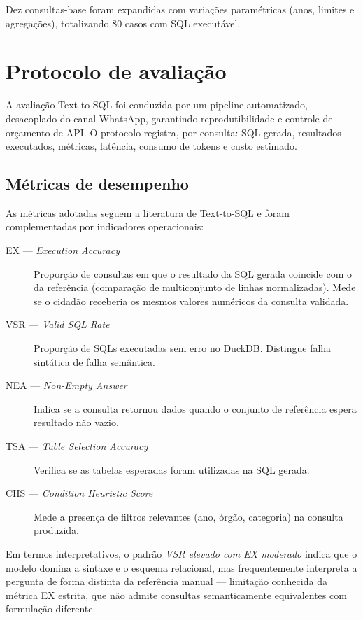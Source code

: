 Dez consultas-base foram expandidas com variações paramétricas (anos, limites e agregações), totalizando 80 casos com SQL executável.

\section{Protocolo de avaliação}

A avaliação Text-to-SQL foi conduzida por um pipeline automatizado, desacoplado do canal WhatsApp, garantindo reprodutibilidade e controle de orçamento de API. O protocolo registra, por consulta: SQL gerada, resultados executados, métricas, latência, consumo de tokens e custo estimado.

\subsection{Métricas de desempenho}

As métricas adotadas seguem a literatura de Text-to-SQL e foram complementadas por indicadores operacionais:

\begin{description}
    \item[EX --- \textit{Execution Accuracy}] Proporção de consultas em que o resultado da SQL gerada coincide com o da referência (comparação de multiconjunto de linhas normalizadas). Mede se o cidadão receberia os mesmos valores numéricos da consulta validada.
    \item[VSR --- \textit{Valid SQL Rate}] Proporção de SQLs executadas sem erro no DuckDB. Distingue falha sintática de falha semântica.
    \item[NEA --- \textit{Non-Empty Answer}] Indica se a consulta retornou dados quando o conjunto de referência espera resultado não vazio.
    \item[TSA --- \textit{Table Selection Accuracy}] Verifica se as tabelas esperadas foram utilizadas na SQL gerada.
    \item[CHS --- \textit{Condition Heuristic Score}] Mede a presença de filtros relevantes (ano, órgão, categoria) na consulta produzida.
\end{description}

Em termos interpretativos, o padrão \textit{VSR elevado com EX moderado} indica que o modelo domina a sintaxe e o esquema relacional, mas frequentemente interpreta a pergunta de forma distinta da referência manual --- limitação conhecida da métrica EX estrita, que não admite consultas semanticamente equivalentes com formulação diferente.

